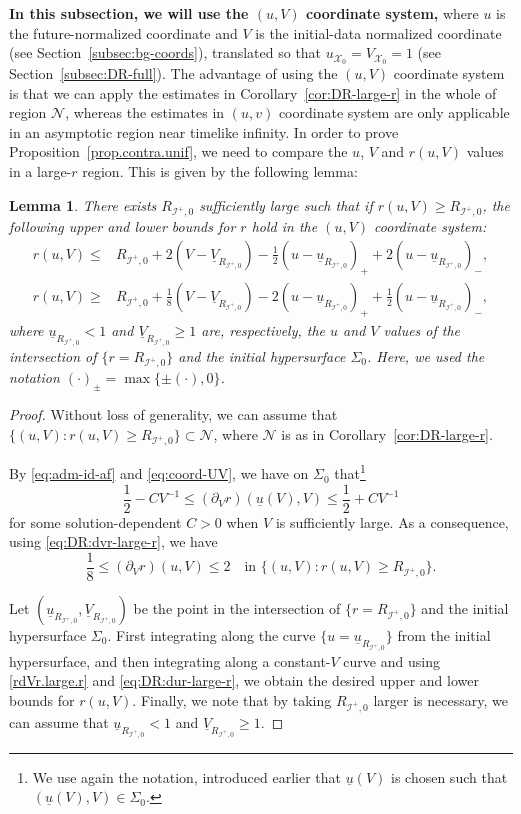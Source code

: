 \documentclass[10pt, reqno]{amsart}
\newtheorem{lemma}[theorem]{Lemma}
\theoremstyle{definition}
\theoremstyle{remark}
\theoremstyle{conjecture}
\numberwithin{equation}{section}
\newcommand{\set}[1]{\{#1\}}
\newcommand{\rd}{\partial}
\newcommand{\0}{\emptyset}
\newcommand{\calI}{\mathcal I}
\newcommand{\calN}{\mathcal N}
\newcommand{\calX}{\mathcal X}
\newcommand{\f}{\frac}
\newcommand{\NI}{\calI^{+}}						%
\newcommand{\ub}{\underline{u}}
\newcommand{\Vb}{\underline{V}}
\begin{document}
\textbf{In this subsection, we will use the $(u,V)$ coordinate system,} where $u$ is the future-normalized coordinate and $V$ is the initial-data normalized coordinate (see Section~\ref{subsec:bg-coords}), translated so that $u_{\calX_0}=V_{\calX_0}=1$ (see Section~\ref{subsec:DR-full}). The advantage of using the $(u,V)$ coordinate system is that we can apply the estimates in Corollary~\ref{cor:DR-large-r} in the whole of region $\mathcal N$, whereas the estimates in $(u,v)$ coordinate system are only applicable in an asymptotic region near timelike infinity. In order to prove Proposition~\ref{prop.contra.unif}, we need to compare the $u$, $V$ and $r(u,V)$ values in a large-$r$ region. This is given by the following lemma:
\begin{lemma}\label{lem.uv-est}
There exists $R_{\NI,0}$ sufficiently large such that if $r(u,V)\geq R_{\NI,0}$, the following upper and lower bounds for $r$ hold in the $(u,V)$ coordinate system:
\begin{align*}
r(u,V)\leq & R_{\NI,0}+2(V - \Vb_{R_{\NI,0}})-\f 12(u-\ub_{R_{\NI,0}})_++2(u-\ub_{R_{\NI,0}})_-, \\
r(u, V)\geq &R_{\NI,0}+\f 18 (V - \Vb_{R_{\NI,0}})-2(u-\ub_{R_{\NI,0}})_++\f 12(u-\ub_{R_{\NI,0}})_-,
\end{align*}
where $\ub_{R_{\NI,0}}<1$ and $\Vb_{R_{\NI,0}} \geq 1$ are, respectively, the $u$ and $V$ values of the intersection of $\{r=R_{\NI,0}\}$ and the initial hypersurface $\Sigma_0$. Here, we used the notation $(\cdot)_{\pm} = \max \set{\pm (\cdot), 0}$.
\end{lemma}
\begin{proof}
Without loss of generality, we can assume that $\{(u,V):r(u,V)\geq R_{\NI,0}\}\subset \mathcal N$, where $\calN$ is as in Corollary~\ref{cor:DR-large-r}.

By \eqref{eq:adm-id-af} and \eqref{eq:coord-UV}, we have on $\Sigma_0$ that\footnote{We use again the notation, introduced earlier that $\ub(V)$ is chosen such that $(\ub(V),V)\in \Sigma_0$.}
\begin{equation}\label{rdVr.initial}
\f 12-CV^{-1}\leq (\rd_V r)(\ub(V),V)\leq \f 12 +CV^{-1}
\end{equation}
for some solution-dependent $C>0$ when $V$ is sufficiently large. As a consequence, using \eqref{eq:DR:dvr-large-r}, we have
\begin{equation}\label{rdVr.large.r}
\f 18\leq (\rd_V r)(u,V)\leq 2\quad\mbox{in } \{(u,V):r(u,V)\geq R_{\NI,0}\}.
\end{equation}

Let $(\ub_{R_{\NI,0}}, \Vb_{R_{\NI,0}})$ be the point in the intersection of $\{r=R_{\NI,0}\}$ and the initial hypersurface $\Sigma_0$. First integrating along the curve $\{u=\ub_{R_{\NI,0}}\}$ from the initial hypersurface, and then integrating along a constant-$V$ curve and using \eqref{rdVr.large.r} and \eqref{eq:DR:dur-large-r}, we obtain the desired upper and lower bounds for $r(u, V)$.
Finally, we note that by taking $R_{\NI,0}$ larger is necessary, we can assume that $\ub_{R_{\NI,0}}<1$ and $\Vb_{R_{\NI,0}} \geq 1$. \qedhere
\end{proof}
\end{document}
